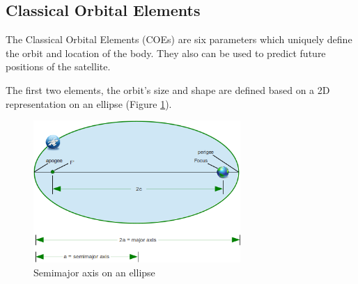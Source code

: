 \subsection{Classical Orbital Elements}
The Classical Orbital Elements (COEs) are six parameters which uniquely define the orbit and location of the body. They also can be used to predict future positions of the satellite. \cite{IntAstr}

The first two elements, the orbit's size and shape are defined based on a 2D representation on an ellipse (Figure \ref{f2.1}).

\begin{figure}[H]
\centerline{\includegraphics[width=0.7\textwidth]{images/Ellipse.png}}
\caption{Semimajor axis on an ellipse}
\label{f2.1}
\end{figure}

